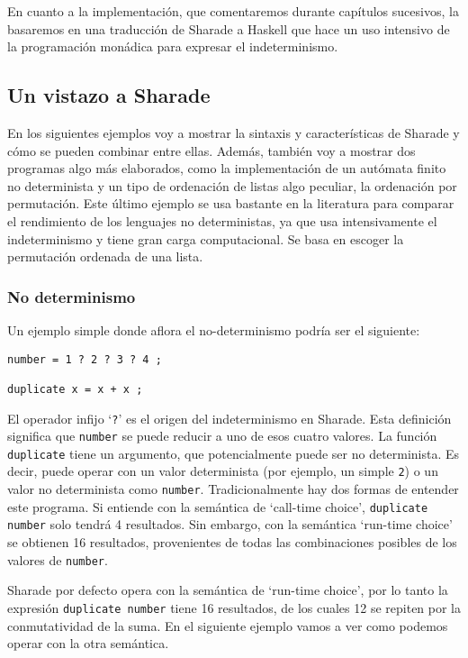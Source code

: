 \documentclass[class=article, crop=false]{standalone}
\begin{document}
En cuanto a la implementación, que comentaremos durante capítulos sucesivos, la basaremos en
una traducción de Sharade a Haskell que hace un uso intensivo de la programación monádica
para expresar el indeterminismo.

\subsection{Un vistazo a Sharade}

En los siguientes ejemplos voy a mostrar la sintaxis y características de Sharade y cómo se
pueden combinar entre ellas. Además, también voy a mostrar dos programas algo más elaborados,
como la implementación de un autómata finito no determinista y un tipo de ordenación de
listas algo peculiar, la ordenación por permutación. Este último ejemplo se usa bastante en
la literatura para comparar el rendimiento de los lenguajes no deterministas, ya que usa
intensivamente el indeterminismo y tiene gran carga computacional. Se basa en escoger la
permutación ordenada de una lista.

\subsubsection{No determinismo}

Un ejemplo simple donde aflora el no-determinismo podría ser el siguiente:

\begin{verbatim}
number = 1 ? 2 ? 3 ? 4 ;

duplicate x = x + x ;
\end{verbatim}

El operador infijo `\verb`?`' es el origen del indeterminismo en Sharade. Esta definición
significa que \verb`number` se puede reducir a uno de esos cuatro valores. La función
\verb`duplicate` tiene un argumento, que potencialmente puede ser no determinista. Es decir,
puede operar con un valor determinista (por ejemplo, un simple \verb`2`) o un valor no
determinista como \verb`number`. Tradicionalmente hay dos formas de entender este programa.
Si entiende con la semántica de `call-time choice', \verb`duplicate number` solo tendrá 4
resultados. Sin embargo, con la semántica `run-time choice' se obtienen 16 resultados,
provenientes de todas las combinaciones posibles de los valores de \verb`number`.

Sharade por defecto opera con la semántica de `run-time choice', por lo tanto la expresión
\verb`duplicate number` tiene 16 resultados, de los cuales 12 se repiten por la
conmutatividad de la suma. En el siguiente ejemplo vamos a ver como podemos operar con la
otra semántica.
\end{document}
